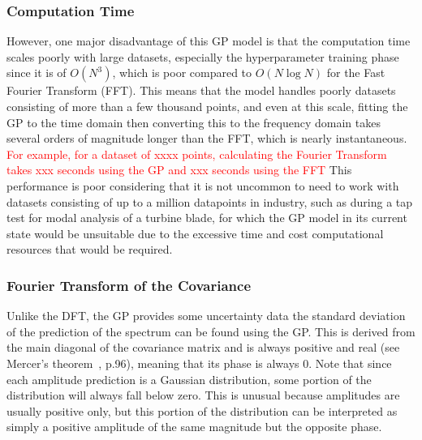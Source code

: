 \documentclass[12pt]{article}
\begin{document}
    \subsubsection{Computation Time}
    However, one major disadvantage of this GP model is that the computation time scales poorly with large datasets, especially the hyperparameter training phase since it is of $O(N^3)$, which is poor compared to $O(N \log{N})$ for the Fast Fourier Transform (FFT).
    This means that the model handles poorly datasets consisting of more than a few thousand points, and even at this scale, fitting the GP to the time domain then converting this to the frequency domain takes several orders of magnitude longer than the FFT, which is nearly instantaneous.
    \textcolor{red}{For example, for a dataset of xxxx points, calculating the Fourier Transform takes xxx seconds using the GP and xxx seconds using the FFT}
    This performance is poor considering that it is not uncommon to need to work with datasets consisting of up to a million datapoints in industry, such as during a tap test for modal analysis of a turbine blade, for which the GP model in its current state would be unsuitable due to the excessive time and cost computational resources that would be required.

    \subsubsection{Fourier Transform of the Covariance}
    Unlike the DFT, the GP provides some uncertainty data the standard deviation of the prediction of the spectrum can be found using the GP\@.
    This is derived from the main diagonal of the covariance matrix and is always positive and real (see Mercer's theorem~\cite{rasmussen2006gaussian}, p.96), meaning that its phase is always 0.
    Note that since each amplitude prediction is a Gaussian distribution, some portion of the distribution will always fall below zero.
    This is unusual because amplitudes are usually positive only, but this portion of the distribution can be interpreted as simply a positive amplitude of the same magnitude but the opposite phase.
\end{document}
